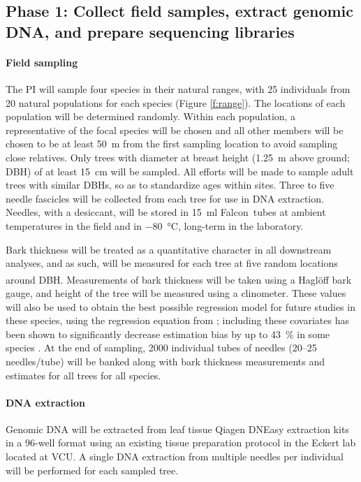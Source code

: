 \subsection*{Phase 1: Collect field samples, extract genomic DNA, and prepare sequencing libraries}

\paragraph{Field sampling}

The PI will sample four species in their natural ranges, with 25 individuals from 20 natural populations for each 
species (Figure \ref{f:range}).  The locations of each population will be determined randomly.  Within each population, a representative 
of the focal species will be chosen and all other members will be chosen to be at least \SI{50}{m} from the first sampling 
location to avoid sampling close relatives.  Only trees with diameter at breast height (\SI{1.25}{m} above ground; DBH) of at least 
\SI{15}{cm} will be sampled. All efforts will be made to sample adult trees with similar DBHs, so as to standardize ages within sites.
Three to five needle fascicles will be collected from each tree for use in DNA extraction.  Needles, with a desiccant, 
will be stored in \SI{15}{\ml} Falcon\texttrademark\ tubes  at ambient temperatures in the field and in \SI{-80}{\celsius}, 
long-term in the laboratory.  

Bark thickness will be treated as a quantitative character in all downstream analyses, and as such, will be measured for each tree at five 
random locations around DBH.  Measurements of bark thickness will be taken using a 
Hagl\"{o}ff\textsuperscript{\textregistered} bark gauge, and height of the tree will be measured using a clinometer.  These values 
will also be used to obtain the best possible regression model for future studies in these species, using the 
regression equation from \citet{Cao:1986th}; including these covariates has been shown to significantly decrease estimation
bias by up to \SI{43}{\percent} in some species \citep{Li:2010bl}.  At the end of sampling, \num{2000} individual tubes of 
needles (20--25 needles/tube) will be banked along with bark thickness measurements and estimates for all trees for all species.

\paragraph{DNA extraction}
Genomic DNA will be extracted from leaf tissue Qiagen DNEasy extraction kits in a 96-well format using an existing tissue preparation
protocol in the Eckert lab located at VCU.  A single DNA extraction from multiple needles per individual will be performed for each sampled 
tree.

